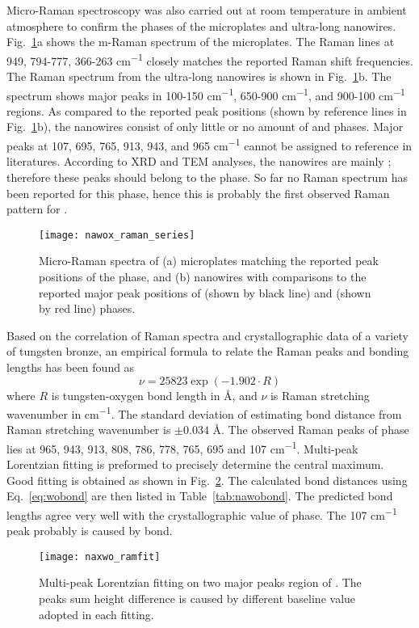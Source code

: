 Micro-Raman spectroscopy was also carried out at room temperature in ambient atmosphere to confirm the phases of the microplates and ultra-long nanowires. Fig.~\ref{fig:nawoxram}a shows the m-Raman spectrum of the microplates. The Raman lines at 949, 794-777, 366-263 \si{cm^{-1}} closely matches the reported  Raman shift frequencies.\cite{Fomichev1992} The Raman spectrum from the ultra-long nanowires is shown in Fig.~\ref{fig:nawoxram}b. The spectrum shows major peaks in 100-150 \si{cm^{-1}}, 650-900 \si{cm^{-1}}, and 900-100 \si{cm^{-1}} regions. As compared to the reported peak positions (shown by reference lines in Fig.~\ref{fig:nawoxram}b), the nanowires consist of only little or no amount of  and  phases. Major peaks at 107, 695, 765, 913, 943, and 965 \si{cm^{-1}} cannot be assigned to reference in literatures. According to XRD and TEM analyses, the nanowires are mainly ; therefore these peaks should belong to the  phase. So far no Raman spectrum has been reported for this phase, hence this is probably the first observed Raman pattern for .
\begin{figure}[htb]
\centering
\texttt{[image: nawox\_raman\_series]}
\caption[Raman spectra on ]{Micro-Raman spectra of (a) microplates matching the reported peak positions of the  phase, and (b) nanowires with comparisons to the reported major peak positions of  (shown by black line) and  (shown by red line) phases.}
\label{fig:nawoxram}
\end{figure}
Based on the correlation of Raman spectra and crystallographic data of a variety of tungsten bronze, an empirical formula to relate the Raman peaks and  bonding lengths has been found as
\begin{equation}\label{eq:wobond}
\nu = 25823 \exp(-1.902\cdot R)
\end{equation}
where $R$ is tungsten-oxygen bond length in \AA, and $\nu$ is Raman stretching wavenumber in \si{cm^{-1}}.\cite{Hardcastle1995} The standard deviation of estimating  bond distance from Raman stretching wavenumber is $\pm0.034$ \AA. The observed Raman peaks of  phase lies at 965, 943, 913, 808, 786, 778, 765, 695 and 107 \si{cm^{-1}}. Multi-peak Lorentzian fitting is preformed to precisely determine the central maximum. Good fitting is obtained as shown in Fig.~\ref{fig:naworamfit}. The calculated  bond distances using Eq.~\ref{eq:wobond} are then listed in Table~\ref{tab:nawobond}. The predicted  bond lengths agree very well with the crystallographic value of  phase.\cite{Triantafyllou1999a} The 107 \si{cm^{-1}} peak probably is caused by  bond.
\begin{figure}[htb]
\centering
\texttt{[image: naxwo\_ramfit]}
\caption[ Raman fitting]{Multi-peak Lorentzian fitting on two major peaks region of . The peaks sum height difference is caused by different baseline value adopted in each fitting.}
\label{fig:naworamfit}
\end{figure}

